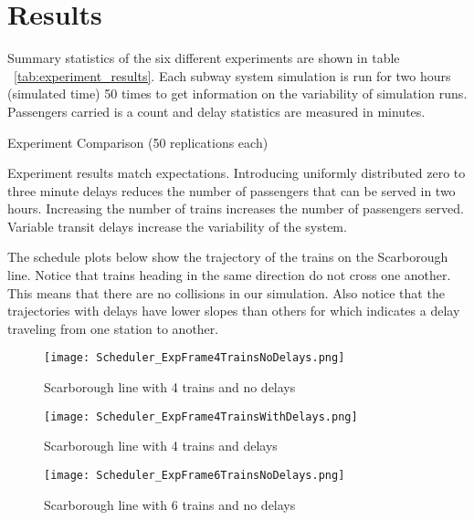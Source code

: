 \section{Results}

Summary statistics of the six different experiments are shown in table
~\ref{tab:experiment_results}. Each subway system simulation is run for two
hours (simulated time) 50 times to get information on the variability of
simulation runs. Passengers carried is a count and delay statistics are 
measured in minutes.

\begin{sidewaystable}
    \centering
    \caption{Experiment Comparison (50 replications each)}
    \label{tab:experiment_results}
\end{sidewaystable}

Experiment results match expectations. Introducing uniformly distributed zero
to three minute delays reduces the number of passengers that can be served in
two hours. Increasing the number of trains increases the number of passengers
served. Variable transit delays increase the variability of the system.

The schedule plots below show the trajectory of the trains on the Scarborough
line. Notice that trains heading in the same direction do not cross one
another. This means that there are no collisions in our simulation. Also notice
that the trajectories with delays have lower slopes than others for which
indicates a delay traveling from one station to another.

\begin{figure}[tb]
	\centering
	\texttt{[image: Scheduler\_ExpFrame4TrainsNoDelays.png]}
	\caption{Scarborough line with 4 trains and no delays}\label{fig:4trainsNoDelay}
\end{figure}

\begin{figure}[tb]
	\centering
	\texttt{[image: Scheduler\_ExpFrame4TrainsWithDelays.png]}
	\caption{Scarborough line with 4 trains and delays}\label{fig:4trainsWithDelay}
\end{figure}

\begin{figure}[tb]
	\centering
	\texttt{[image: Scheduler\_ExpFrame6TrainsNoDelays.png]}
	\caption{Scarborough line with 6 trains and no delays}\label{fig:6trainsNoDelay}
\end{figure}

